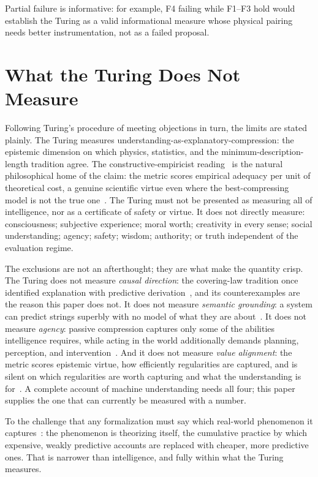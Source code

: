 \documentclass[11pt]{article}
\begin{document}
Partial failure is informative: for example, F4 failing while F1--F3 hold would establish the Turing as a valid informational measure whose physical pairing needs better instrumentation, not as a failed proposal.

\section{What the Turing Does Not Measure}

Following Turing's procedure of meeting objections in turn, the limits are stated plainly. The Turing measures understanding-as-explanatory-compression: the epistemic dimension on which physics, statistics, and the minimum-description-length tradition agree. The constructive-empiricist reading~\cite{vanfraassen1980} is the natural philosophical home of the claim: the metric scores empirical adequacy per unit of theoretical cost, a genuine scientific virtue even where the best-compressing model is not the true one~\cite{shmueli2010}. The Turing must not be presented as measuring all of intelligence, nor as a certificate of safety or virtue. It does not directly measure: consciousness; subjective experience; moral worth; creativity in every sense; social understanding; agency; safety; wisdom; authority; or truth independent of the evaluation regime.

The exclusions are not an afterthought; they are what make the quantity crisp. The Turing does not measure \textit{causal direction}: the covering-law tradition once identified explanation with predictive derivation~\cite{hempel1948}, and its counterexamples are the reason this paper does not. It does not measure \textit{semantic grounding}: a system can predict strings superbly with no model of what they are about~\cite{benderkoller2020}. It does not measure \textit{agency}: passive compression captures only some of the abilities intelligence requires, while acting in the world additionally demands planning, perception, and intervention~\cite{hernandezorallo2010}. And it does not measure \textit{value alignment}: the metric scores epistemic virtue, how efficiently regularities are captured, and is silent on which regularities are worth capturing and what the understanding is for~\cite{gabriel2020}. A complete account of machine understanding needs all four; this paper supplies the one that can currently be measured with a number.

To the challenge that any formalization must say which real-world phenomenon it captures~\cite{lifschitz2024}: the phenomenon is theorizing itself, the cumulative practice by which expensive, weakly predictive accounts are replaced with cheaper, more predictive ones. That is narrower than intelligence, and fully within what the Turing measures.
\end{document}
